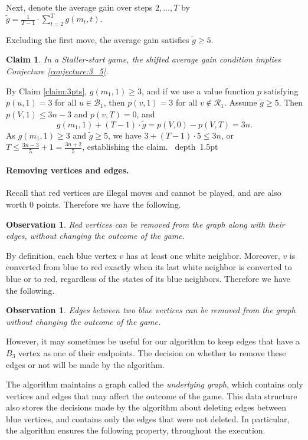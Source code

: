 \documentclass[11pt]{article}
\def\Proof{\par\noindent{\bf Proof:~}}
\def\blackslug{\hbox{\hskip 1pt \vrule width 4pt height 8pt
    depth 1.5pt \hskip 1pt}}
\def\QED{\quad\blackslug\lower 8.5pt\null\par}
\newtheorem{claim}[theorem]{Claim}
\newtheorem{observation}[theorem]{Observation}
\theoremstyle{definition}
\begin{document}
Next, denote the average gain over steps $2, ..., T$ by 
~~~~~ $\displaystyle \tilde{g} = \frac{1}{T-1} \cdot \sum_{t=2}^{T}g(m_t, t).$
\smallskip
\par{}
Excluding the first move, the average gain satisfies $\tilde{g} \ge 5$.
\begin{claim}
\label{claim:staller_start_cond}
In a Staller-start game, the shifted average gain condition implies
Conjecture \ref{conjecture:3_5}.
\end{claim}
\Proof
By Claim \ref{claim:3pts}, $g(m_1, 1) \geq 3$, and if we use a value function $p$ satisfying $p(u, 1) = 3$ for all $u \in \mathcal{B}_1$, then 
$p(v, 1) = 3$ for all $v \notin \mathcal{R}_1$.
Assume $\tilde{g} \geq 5$.
Then $p(V, 1) \leq 3n - 3$ and $p(v, T) = 0$, and 
$$ g(m_1, 1) + (T-1)\cdot \tilde{g} = p(V, 0) - p(V, T) = 3n .$$
As $g(m_1, 1) \geq 3$ and $\tilde{g} \geq 5$, we have
$3 + (T-1) \cdot 5 \leq 3n$, or 
$T \leq \frac{3n-3}{5} + 1 = \frac{3n+2} {5}$,
establishing the claim.
\QED

\paragraph{Removing vertices and edges.}
Recall that red vertices are illegal moves and cannot be played, and are also worth $0$ points. Therefore we have the following.

\begin{observation}
Red vertices can be removed from the graph along with their edges, without changing the outcome of the game.
\end{observation}

By definition, each blue vertex $v$ has at least one white neighbor. 
Moreover, $v$ is converted from blue to red exactly when its last white neighbor is converted to blue or to red, regardless of the states of its blue neighbors. 
Therefore we have the following.
\begin{observation}
Edges between two blue vertices can be removed from the graph without changing the outcome of the game.
\end{observation}

However, it may sometimes be useful for our algorithm to keep edges that have a $B_3$ vertex as one of their endpoints.
The decision on whether to remove these edges or not will be made by the algorithm.

The algorithm maintains a graph called the \emph{underlying graph}, 
which contains only vertices and edges that may affect the outcome of the game.
This data structure also stores the decisions made by the algorithm about deleting edges between blue vertices,
and contains only the edges that were not deleted.
In particular, the algorithm ensures the following property, throughout the execution.
\end{document}
